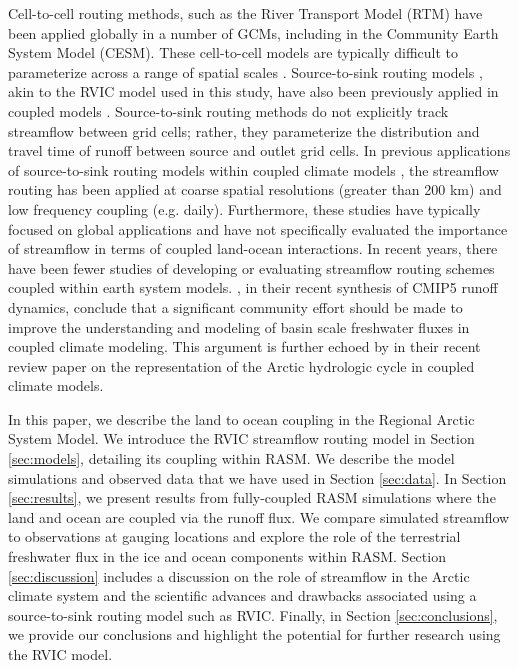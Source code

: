 \documentclass[jgrga, draft]{agutex}
\begin{document}
\begin{article}
Cell-to-cell routing methods, such as the River Transport Model (RTM) \citep{Branstetter_2003} have been applied globally in a number of GCMs, including in the Community Earth System Model (CESM).
These cell-to-cell models are typically difficult to parameterize across a range of spatial scales \citep{Sushama_2004}.
Source-to-sink routing models \citep[e.g.][]{Lohmann_1996,Naden_1992}, akin to the RVIC model used in this study, have also been previously applied in coupled models \citep[e.g.][]{Olivera_2000}.
Source-to-sink routing methods do not explicitly track streamflow between grid cells; rather, they parameterize the distribution and travel time of runoff between source and outlet grid cells.
In previous applications of source-to-sink routing models within coupled climate models \citep[e.g.][]{Olivera_2000}, the streamflow routing has been applied at coarse spatial resolutions (greater than 200 km) and low frequency coupling (e.g. daily).
Furthermore, these studies have typically focused on global applications and have not specifically evaluated the importance of streamflow in terms of coupled land-ocean interactions.
In recent years, there have been fewer studies of developing or evaluating streamflow routing schemes coupled within earth system models. %
\citet{Bring_2015}, in their recent synthesis of CMIP5 runoff dynamics, conclude that a significant community effort should be made to improve the understanding and modeling of basin scale freshwater fluxes in coupled climate modeling.
This argument is further echoed by \citet{Lique_2015} in their recent review paper on the representation of the Arctic hydrologic cycle in coupled climate models.

In this paper, we describe the land to ocean coupling in the Regional Arctic System Model.
We introduce the RVIC streamflow routing model in Section \ref{sec:models}, detailing its coupling within RASM.
We describe the model simulations and observed data that we have used in Section \ref{sec:data}.
In Section \ref{sec:results}, we present results from fully-coupled RASM simulations where the land and ocean are coupled via the runoff flux.
We compare simulated streamflow to observations at gauging locations and explore the role of the terrestrial freshwater flux in the ice and ocean components within RASM.
Section \ref{sec:discussion} includes a discussion on the role of streamflow in the Arctic climate system and the scientific advances and drawbacks associated using a source-to-sink routing model such as RVIC.
Finally, in Section \ref{sec:conclusions}, we provide our conclusions and highlight the potential for further research using the RVIC model.


\end{article}
\end{document}
